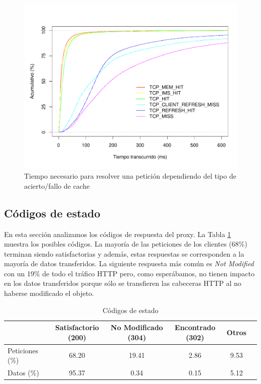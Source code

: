 \documentclass[twocolumn]{Jornadas}
\begin{document}
\begin{figure}[ht!]
\includegraphics[scale=0.30]{figures/ElapsedTimeAll_1k_full.pdf} 
\caption{Tiempo necesario para resolver una petición dependiendo del tipo de acierto/fallo de cache}
\label{fig:elapsed}
\end{figure}

\subsection{Códigos de estado}
En esta sección analizamos los códigos de respuesta del proxy. La Tabla \ref{table:codigos} muestra los posibles códigos. La mayoría de las peticiones de los clientes (68\%) terminan siendo satisfactorias y además, estas respuestas se corresponden a la mayoría de datos transferidos. La siguiente respuesta más común es \textit{Not Modified} con un 19\% de todo el tráfico HTTP pero, como esperábamos, no tienen impacto en los datos transferidos porque sólo se transfieren las cabeceras HTTP al no haberse modificado el objeto.

\begin{table}
\centering
\renewcommand{\baselinestretch}{1.5}
\scriptsize
\begin{tabular}{|l||c|c|c|c|c|} \hline
  & Satisfactorio (200) & No Modificado (304) & Encontrado (302) & Otros\\\hline\hline
Peticiones (\%)    & 68.20  & 19.41 & 2.86 & 9.53            \\\hline  
Datos (\%)        & 95.37   & 0.34 & 0.15 & 5.12             \\\hline 
\end{tabular}
\caption{Códigos de estado}
\label{table:codigos}
\end{table}
\end{document}
